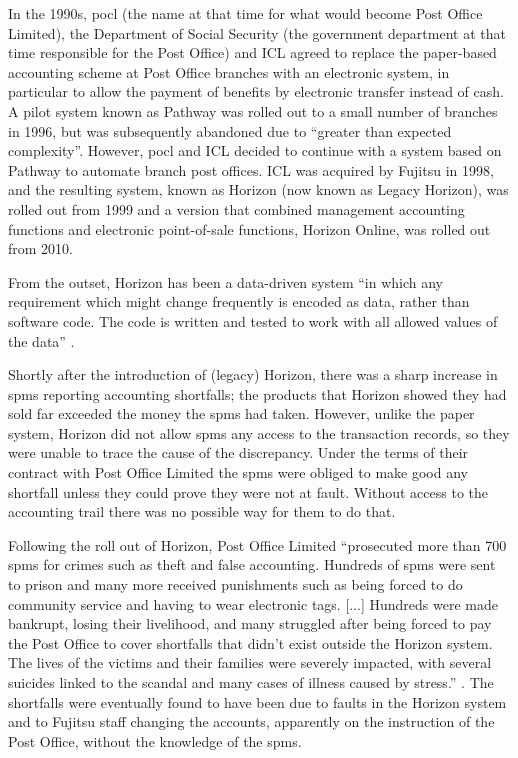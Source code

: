 In the 1990s, \gls{pocl} (the name at that time for what would become Post Office Limited), the Department of Social Security (the government department at that time responsible for the Post Office) and ICL agreed to replace the paper-based accounting scheme at Post Office branches with an electronic system, in particular to allow the payment of benefits by electronic transfer instead of cash. A pilot system known as Pathway was rolled out to a small number of branches in 1996, but was subsequently abandoned due to ``greater than expected complexity''. However, \gls{pocl} and ICL decided to continue with a system based on Pathway to automate branch post offices. ICL was acquired by Fujitsu in 1998, and the resulting system, known as Horizon (now known as Legacy Horizon), was rolled out from 1999 and a version that combined management accounting functions and electronic point-of-sale functions, Horizon Online, was rolled out from 2010.

From the outset, Horizon has been a \gls{data-driven system} ``in which any requirement which
might change frequently is encoded as data, rather than software code. The code is
written and tested to work with all allowed values of the data'' \cite{citation:bates_v_pol_tech}. 

Shortly after the introduction of (legacy) Horizon, there was a sharp increase in \glspl{spm} reporting accounting shortfalls; the products that Horizon showed they had sold far exceeded the money the \glspl{spm} had taken. However, unlike the paper system, Horizon did not allow \glspl{spm} any access to the transaction records, so they were unable to trace the cause of the discrepancy. Under the terms of their contract with Post Office Limited the \glspl{spm} were obliged to make good any shortfall unless they could prove they were not at fault. Without access to the accounting trail there was no possible way for them to do that.

Following the roll out of Horizon, Post Office Limited ``prosecuted more than 700 \glspl{spm}  for crimes such as theft and false accounting. Hundreds of \glspl{spm} were sent to prison and many more received punishments such as being forced to do community service and having to wear electronic tags. [...] Hundreds were made bankrupt, losing their livelihood, and many struggled after being forced to pay the Post Office to cover shortfalls that didn’t exist outside the Horizon system. The lives of the victims and their families were severely impacted, with several suicides linked to the scandal and many cases of illness caused by stress.'' \cite{citation:cw_horizon}. The shortfalls were eventually found to have been due to faults in the Horizon system and to Fujitsu staff changing the accounts, apparently on the instruction of the Post Office, without the knowledge of the \glspl{spm}.

